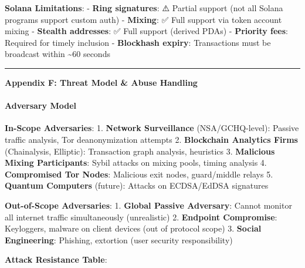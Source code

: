 \documentclass[
  11pt,
]{article}
\begin{document}
\textbf{Solana Limitations}: - \textbf{Ring signatures}: ⚠️ Partial
support (not all Solana programs support custom auth) - \textbf{Mixing}:
✅ Full support via token account mixing - \textbf{Stealth addresses}:
✅ Full support (derived PDAs) - \textbf{Priority fees}: Required for
timely inclusion - \textbf{Blockhash expiry}: Transactions must be
broadcast within \textasciitilde60 seconds

\begin{center}\rule{0.5\linewidth}{0.5pt}\end{center}

\textbf{Appendix F: Threat Model \& Abuse Handling}

\hypertarget{adversary-model}{%
\paragraph{Adversary Model}\label{adversary-model}}

\textbf{In-Scope Adversaries}: 1. \textbf{Network Surveillance}
(NSA/GCHQ-level): Passive traffic analysis, Tor deanonymization attempts
2. \textbf{Blockchain Analytics Firms} (Chainalysis, Elliptic):
Transaction graph analysis, heuristics 3. \textbf{Malicious Mixing
Participants}: Sybil attacks on mixing pools, timing analysis 4.
\textbf{Compromised Tor Nodes}: Malicious exit nodes, guard/middle
relays 5. \textbf{Quantum Computers} (future): Attacks on ECDSA/EdDSA
signatures

\textbf{Out-of-Scope Adversaries}: 1. \textbf{Global Passive Adversary}:
Cannot monitor all internet traffic simultaneously (unrealistic) 2.
\textbf{Endpoint Compromise}: Keyloggers, malware on client devices (out
of protocol scope) 3. \textbf{Social Engineering}: Phishing, extortion
(user security responsibility)

\textbf{Attack Resistance Table}:
\end{document}
